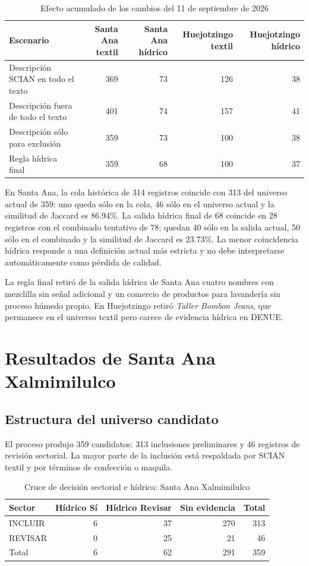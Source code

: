 \documentclass[11pt,letterpaper]{article}
\begin{document}
\begin{table}[H]
\centering
\caption{Efecto acumulado de los cambios del 11 de septiembre de 2026}
\begin{tabular}{lrrrr}
\toprule
Escenario & Santa Ana textil & Santa Ana h\'idrico & Huejotzingo textil & Huejotzingo h\'idrico\\
\midrule
Descripci\'on SCIAN en todo el texto & 369 & 73 & 126 & 38\\
Descripci\'on fuera de todo el texto & 401 & 74 & 157 & 41\\
Descripci\'on s\'olo para exclusi\'on & 359 & 73 & 100 & 38\\
Regla h\'idrica final & 359 & 68 & 100 & 37\\
\bottomrule
\end{tabular}
\end{table}

En Santa Ana, la cola hist\'orica de 314 registros coincide con 313 del universo actual de 359: uno queda s\'olo en la cola, 46 s\'olo en el universo actual y la similitud de Jaccard es 86.94\%. La salida h\'idrica final de 68 coincide en 28 registros con el combinado tentativo de 78; quedan 40 s\'olo en la salida actual, 50 s\'olo en el combinado y la similitud de Jaccard es 23.73\%. La menor coincidencia h\'idrica responde a una definici\'on actual m\'as estricta y no debe interpretarse autom\'aticamente como p\'erdida de calidad.

La regla final retir\'o de la salida h\'idrica de Santa Ana cuatro nombres con mezclilla sin se\~nal adicional y un comercio de productos para lavander\'ia sin proceso h\'umedo propio. En Huejotzingo retir\'o \textit{Taller Bombon Jeans}, que permanece en el universo textil pero carece de evidencia h\'idrica en DENUE.

\section{Resultados de Santa Ana Xalmimilulco}

\subsection{Estructura del universo candidato}

El proceso produjo 359 candidatos: 313 inclusiones preliminares y 46 registros de revisión sectorial. La mayor parte de la inclusión está respaldada por SCIAN textil y por términos de confección o maquila.

\begin{table}[H]
\centering
\caption{Cruce de decisión sectorial e hídrica: Santa Ana Xalmimilulco}
\begin{tabular}{lrrrr}
\toprule
Sector & Hídrico Sí & Hídrico Revisar & Sin evidencia & Total\\
\midrule
INCLUIR & 6 & 37 & 270 & 313\\
REVISAR & 0 & 25 & 21 & 46\\
\midrule
Total & 6 & 62 & 291 & 359\\
\bottomrule
\end{tabular}
\end{table}
\end{document}
